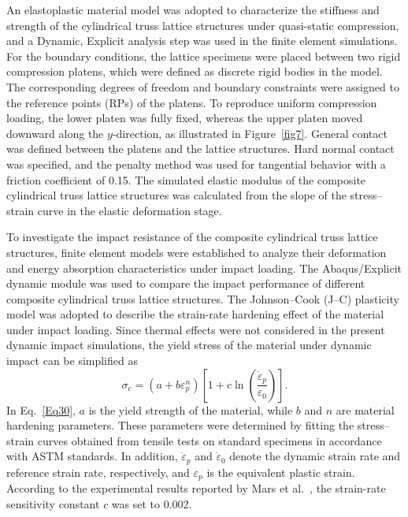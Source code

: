 \documentclass[12pt,a4paper]{article}
\begin{document}
An elastoplastic material model was adopted to characterize the stiffness and strength of the cylindrical truss lattice structures under quasi-static compression, and a Dynamic, Explicit analysis step was used in the finite element simulations. For the boundary conditions, the lattice specimens were placed between two rigid compression platens, which were defined as discrete rigid bodies in the model. The corresponding degrees of freedom and boundary constraints were assigned to the reference points (RPs) of the platens. To reproduce uniform compression loading, the lower platen was fully fixed, whereas the upper platen moved downward along the $y$-direction, as illustrated in Figure~\ref{fig7}. General contact was defined between the platens and the lattice structures. Hard normal contact was specified, and the penalty method was used for tangential behavior with a friction coefficient of 0.15. The simulated elastic modulus of the composite cylindrical truss lattice structures was calculated from the slope of the stress--strain curve in the elastic deformation stage.

To investigate the impact resistance of the composite cylindrical truss lattice structures, finite element models were established to analyze their deformation and energy absorption characteristics under impact loading. The Abaqus/Explicit dynamic module was used to compare the impact performance of different composite cylindrical truss lattice structures. The Johnson--Cook (J--C) plasticity model was adopted to describe the strain-rate hardening effect of the material under impact loading. Since thermal effects were not considered in the present dynamic impact simulations, the yield stress of the material under dynamic impact can be simplified as
%
\begin{equation}
	\sigma_c =
	\left(a+b\varepsilon_p^n\right)
	\left[
	1+c\ln\left(\frac{\dot{\varepsilon}_p}{\dot{\varepsilon}_0}\right)
	\right].
	\label{Eq30}
\end{equation}
%
In Eq.~\eqref{Eq30}, $a$ is the yield strength of the material, while $b$ and $n$ are material hardening parameters. These parameters were determined by fitting the stress--strain curves obtained from tensile tests on standard specimens in accordance with ASTM standards. In addition, $\dot{\varepsilon}_p$ and $\dot{\varepsilon}_0$ denote the dynamic strain rate and reference strain rate, respectively, and $\varepsilon_p$ is the equivalent plastic strain. According to the experimental results reported by Mars et al.~\cite{Ref50}, the strain-rate sensitivity constant $c$ was set to 0.002.
\end{document}
